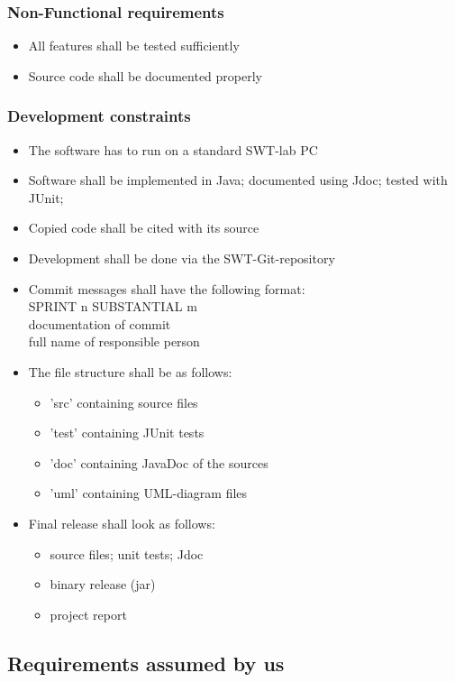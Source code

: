\subsubsection{Non-Functional requirements}
\begin{itemize}
	\item All features shall be tested sufficiently
	\item Source code shall be documented properly
\end{itemize}

\subsubsection{Development constraints}
\begin{itemize}
	\item The software has to run on a standard SWT-lab PC
	\item Software shall be implemented in Java; documented using Jdoc; tested with JUnit;
	\item Copied code shall be cited with its source
	\item Development shall be done via the SWT-Git-repository
	\item Commit messages shall have the following format: \\
	SPRINT n SUBSTANTIAL m \\
	documentation of commit \\
	full name of responsible person
	\item The file structure shall be as follows:
	\begin{itemize}
		\item 'src' containing source files
		\item 'test' containing JUnit tests
		\item 'doc' containing JavaDoc of the sources
		\item 'uml' containing UML-diagram files
	\end{itemize}
	\item Final release shall look as follows:
	\begin{itemize}
		\item source files; unit tests; Jdoc
		\item binary release (jar)
		\item project report
	\end{itemize}
	
\end{itemize}
\subsection{Requirements assumed by us}
